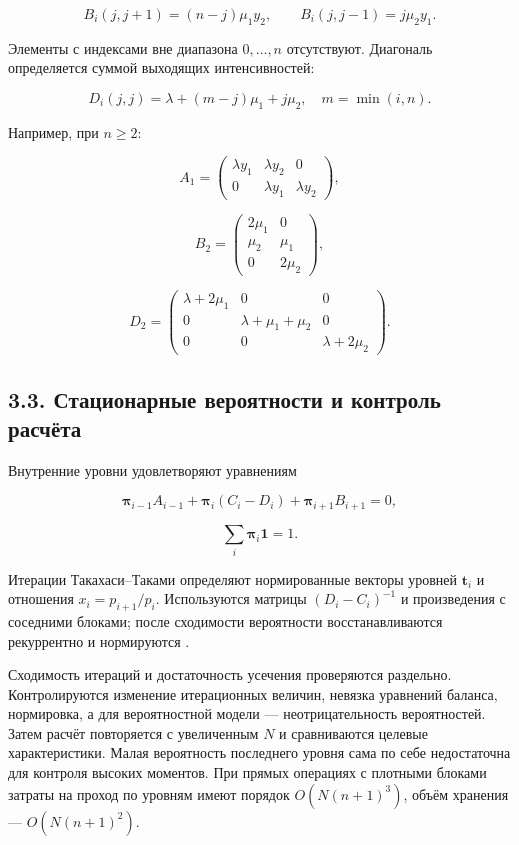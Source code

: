 \[B_i(j,j+1)=(n-j)\mu_1y_2,\qquad
B_i(j,j-1)=j\mu_2y_1.\]


Элементы с индексами вне диапазона \(0,\ldots,n\) отсутствуют. Диагональ определяется суммой выходящих интенсивностей:


\[D_i(j,j)=\lambda+(m-j)\mu_1+j\mu_2,\quad m=\min(i,n).\]


Например, при \(n\ge2\):


\[A_1=\begin{pmatrix}\lambda y_1&\lambda y_2&0\\0&\lambda y_1&\lambda y_2\end{pmatrix},\]

\[B_2=\begin{pmatrix}2\mu_1&0\\\mu_2&\mu_1\\0&2\mu_2\end{pmatrix},\]




\[D_2=\begin{pmatrix}\lambda+2\mu_1&0&0\\0&\lambda+\mu_1+\mu_2&0\\0&0&\lambda+2\mu_2\end{pmatrix}.\]



\subsection*{3.3. Стационарные вероятности и контроль расчёта}
Внутренние уровни удовлетворяют уравнениям


\[\boldsymbol\pi_{i-1}A_{i-1}+\boldsymbol\pi_i(C_i-D_i)+\boldsymbol\pi_{i+1}B_{i+1}=0,\]

\[\sum_i\boldsymbol\pi_i\mathbf1=1.\]


Итерации Такахаси--Таками определяют нормированные векторы уровней \(\boldsymbol t_i\) и отношения \(x_i=p_{i+1}/p_i.\) Используются матрицы \((D_i-C_i)^{-1}\) и произведения с соседними блоками; после сходимости вероятности восстанавливаются рекуррентно и нормируются \cite{takahashi1976,ryzhikov2018ru}.

Сходимость итераций и достаточность усечения проверяются раздельно. Контролируются изменение итерационных величин, невязка уравнений баланса, нормировка, а для вероятностной модели --- неотрицательность вероятностей. Затем расчёт повторяется с увеличенным \(N\) и сравниваются целевые характеристики. Малая вероятность последнего уровня сама по себе недостаточна для контроля высоких моментов. При прямых операциях с плотными блоками затраты на проход по уровням имеют порядок \(O(N(n+1)^3)\), объём хранения --- \(O(N(n+1)^2).\)


